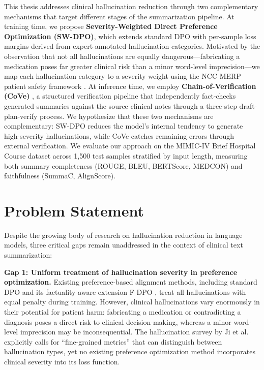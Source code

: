 \documentclass[12pt,a4paper,oneside]{report}
\begin{document}
This thesis addresses clinical hallucination reduction through two complementary mechanisms that target different stages of the summarization pipeline. At training time, we propose \textbf{Severity-Weighted Direct Preference Optimization (SW-DPO)}, which extends standard DPO \cite{rafailov2023dpo} with per-sample loss margins derived from expert-annotated hallucination categories. Motivated by the observation that not all hallucinations are equally dangerous---fabricating a medication poses far greater clinical risk than a minor word-level imprecision---we map each hallucination category to a severity weight using the NCC MERP patient safety framework \cite{nccmerp2001}. At inference time, we employ \textbf{Chain-of-Verification (CoVe)} \cite{dhuliawala2023cove}, a structured verification pipeline that independently fact-checks generated summaries against the source clinical notes through a three-step draft-plan-verify process. We hypothesize that these two mechanisms are complementary: SW-DPO reduces the model's internal tendency to generate high-severity hallucinations, while CoVe catches remaining errors through external verification. We evaluate our approach on the MIMIC-IV Brief Hospital Course dataset \cite{adams2022mimicbhc} across 1,500 test samples stratified by input length, measuring both summary completeness (ROUGE, BLEU, BERTScore, MEDCON) and faithfulness (SummaC, AlignScore).

\section{Problem Statement}
\label{sec:problem}

Despite the growing body of research on hallucination reduction in language models, three critical gaps remain unaddressed in the context of clinical text summarization:

\textbf{Gap 1: Uniform treatment of hallucination severity in preference optimization.}
Existing preference-based alignment methods, including standard DPO \cite{rafailov2023dpo} and its factuality-aware extension F-DPO \cite{chaduvula2026fdpo}, treat all hallucinations with equal penalty during training. However, clinical hallucinations vary enormously in their potential for patient harm: fabricating a medication or contradicting a diagnosis poses a direct risk to clinical decision-making, whereas a minor word-level imprecision may be inconsequential. The hallucination survey by Ji et al. \cite{ji2023hallucination} explicitly calls for ``fine-grained metrics'' that can distinguish between hallucination types, yet no existing preference optimization method incorporates clinical severity into its loss function.
\end{document}

